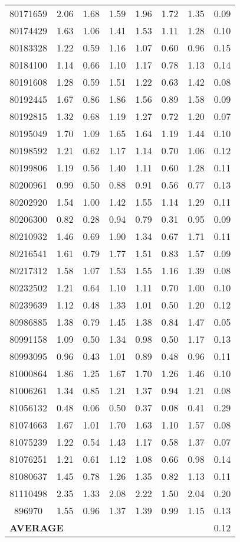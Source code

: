 \begin{longtable}{|c|c c c|c c c|c|}
80171659 & 2.06 & 1.68 & 1.59 & 1.96 & 1.72 & 1.35 & 0.09 \\
80174429 & 1.63 & 1.06 & 1.41 & 1.53 & 1.11 & 1.28 & 0.10 \\
80183328 & 1.22 & 0.59 & 1.16 & 1.07 & 0.60 & 0.96 & 0.15 \\
80184100 & 1.14 & 0.66 & 1.10 & 1.17 & 0.78 & 1.13 & 0.14 \\
80191608 & 1.28 & 0.59 & 1.51 & 1.22 & 0.63 & 1.42 & 0.08 \\
80192445 & 1.67 & 0.86 & 1.86 & 1.56 & 0.89 & 1.58 & 0.09 \\
80192815 & 1.32 & 0.68 & 1.19 & 1.27 & 0.72 & 1.20 & 0.07 \\
80195049 & 1.70 & 1.09 & 1.65 & 1.64 & 1.19 & 1.44 & 0.10 \\
80198592 & 1.21 & 0.62 & 1.17 & 1.14 & 0.70 & 1.06 & 0.12 \\
80199806 & 1.19 & 0.56 & 1.40 & 1.11 & 0.60 & 1.28 & 0.11 \\
80200961 & 0.99 & 0.50 & 0.88 & 0.91 & 0.56 & 0.77 & 0.13 \\
80202920 & 1.54 & 1.00 & 1.42 & 1.55 & 1.14 & 1.29 & 0.11 \\
80206300 & 0.82 & 0.28 & 0.94 & 0.79 & 0.31 & 0.95 & 0.09 \\
80210932 & 1.46 & 0.69 & 1.90 & 1.34 & 0.67 & 1.71 & 0.11 \\
80216541 & 1.61 & 0.79 & 1.77 & 1.51 & 0.83 & 1.57 & 0.09 \\
80217312 & 1.58 & 1.07 & 1.53 & 1.55 & 1.16 & 1.39 & 0.08 \\
80232502 & 1.21 & 0.64 & 1.10 & 1.11 & 0.70 & 1.00 & 0.10 \\
80239639 & 1.12 & 0.48 & 1.33 & 1.01 & 0.50 & 1.20 & 0.12 \\
80986885 & 1.38 & 0.79 & 1.45 & 1.38 & 0.84 & 1.47 & 0.05 \\
80991158 & 1.09 & 0.50 & 1.34 & 0.98 & 0.50 & 1.17 & 0.13 \\
80993095 & 0.96 & 0.43 & 1.01 & 0.89 & 0.48 & 0.96 & 0.11 \\
81000864 & 1.86 & 1.25 & 1.67 & 1.70 & 1.26 & 1.46 & 0.10 \\
81006261 & 1.34 & 0.85 & 1.21 & 1.37 & 0.94 & 1.21 & 0.08 \\
\rowcolor{lightgray}81056132 & 0.48 & 0.06 & 0.50 & 0.37 & 0.08 & 0.41 & 0.29 \\
81074663 & 1.67 & 1.01 & 1.70 & 1.63 & 1.10 & 1.57 & 0.08 \\
81075239 & 1.22 & 0.54 & 1.43 & 1.17 & 0.58 & 1.37 & 0.07 \\
81076251 & 1.21 & 0.61 & 1.12 & 1.08 & 0.66 & 0.98 & 0.14 \\
81080637 & 1.45 & 0.78 & 1.26 & 1.35 & 0.82 & 1.13 & 0.11 \\
81110498 & 2.35 & 1.33 & 2.08 & 2.22 & 1.50 & 2.04 & 0.20 \\
896970 & 1.55 & 0.96 & 1.37 & 1.39 & 0.99 & 1.15 & 0.13 \\
\hline
\multicolumn{7}{|l}{\textbf{AVERAGE}} & 0.12 \\
\end{longtable}
